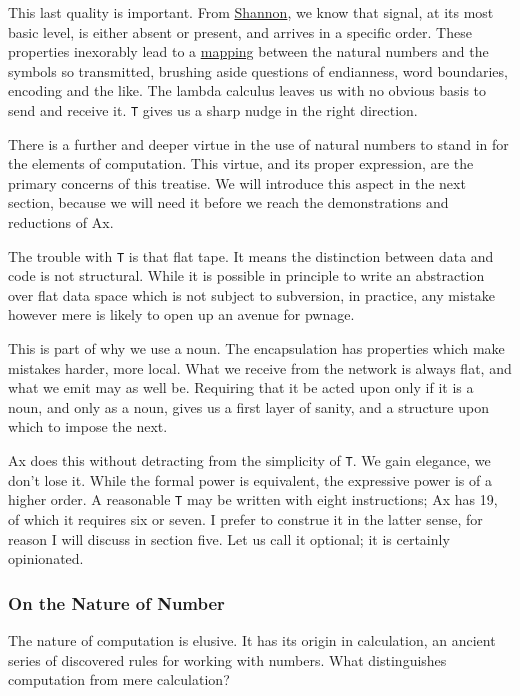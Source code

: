 \documentclass[twoside]{article}
\begin{document}
This last quality is important. From \href{https://en.wikipedia.org/wiki/Claude_Shannon}{Shannon}, we know that signal, at its most basic level, is either absent or present, and arrives in a specific order. These properties inexorably lead to a \href{https://en.wikipedia.org/wiki/Bijection}{mapping} between the natural numbers and the symbols so transmitted, brushing aside questions of endianness, word boundaries, encoding and the like. The lambda calculus leaves us with no obvious basis to send and receive it. \texttt{T} gives us a sharp nudge in the right direction.

There is a further and deeper virtue in the use of natural numbers to stand in for the elements of computation. This virtue, and its proper expression, are the primary concerns of this treatise. We will introduce this aspect in the next section, because we will need it before we reach the demonstrations and reductions of Ax.

The trouble with \texttt{T} is that flat tape. It means the distinction between data and code is not structural. While it is possible in principle to write an abstraction over flat data space which is not subject to subversion, in practice, any mistake however mere is likely to open up an avenue for pwnage.

This is part of why we use a noun. The encapsulation has properties which make mistakes harder, more local. What we receive from the network is always flat, and what we emit may as well be. Requiring that it be acted upon only if it is a noun, and only as a noun, gives us a first layer of sanity, and a structure upon which to impose the next.

Ax does this without detracting from the simplicity of \texttt{T}. We gain elegance, we don't lose it. While the formal power is equivalent, the expressive power is of a higher order. A reasonable \texttt{T} may be written with eight instructions; Ax has 19, of which it requires six or seven. I prefer to construe it in the latter sense, for reason I will discuss in section five. Let us call it optional; it is certainly opinionated.

\subsubsection{On the Nature of Number}

The nature of computation is elusive. It has its origin in calculation, an ancient series of discovered rules for working with numbers. What distinguishes computation from mere calculation?
\end{document}
